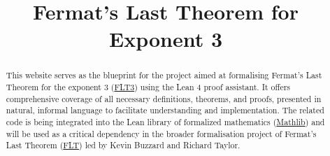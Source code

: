 \documentclass{report}
\title{Fermat's Last Theorem for Exponent 3}
\begin{document}
\maketitle
\begin{abstract}
    This website serves as the blueprint for the project aimed at formalising Fermat’s Last Theorem
    for the exponent 3 (\href{https://github.com/pitmonticone/FLT3}{FLT3}) using the Lean 4 proof assistant.
    It offers comprehensive coverage of all necessary definitions, theorems, and proofs, presented in natural,
    informal language to facilitate understanding and implementation. The related code is being integrated
    into the Lean library of formalized mathematics (\href{https://github.com/leanprover-community/mathlib4}{Mathlib})
    and will be used as a critical dependency in the broader formalisation project of Fermat's Last Theorem
    (\href{https://github.com/ImperialCollegeLondon/FLT}{FLT}) led by Kevin Buzzard and Richard Taylor.
\end{abstract}


\end{document}
